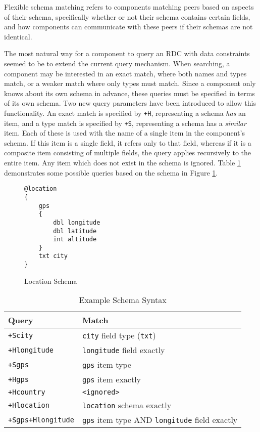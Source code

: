 \documentclass[12pt,twoside,notitlepage]{report}
\begin{document}
Flexible schema matching refers to components matching peers based on aspects of their schema, specifically whether or not their schema contains certain fields, and how components can communicate with these peers if their schemas are not identical. 

The most natural way for a component to query an RDC with data constraints seemed to be to extend the current query mechanism. 
When searching, a component may be interested in an exact match, where both names and types match, or a weaker match where only types must match. 
Since a component only knows about its own schema in advance, these queries must be specified in terms of its own schema.
Two new query parameters have been introduced to allow this functionality. 
An exact match is specified by {\tt +H}, representing a schema {\sl has} an item, and a type match is specified by {\tt +S}, representing a schema has a {\sl similar} item.
Each of these is used with the name of a single item in the component's schema.
If this item is a single field, it refers only to that field, whereas if it is a composite item consisting of multiple fields, the query applies recursively to the entire item. 
Any item which does not exist in the schema is ignored. 
Table \ref{tab:example_schema_syntax} demonstrates some possible queries based on the schema in Figure \ref{fig:locationschema}.

\begin{figure}
\begin{lstlisting}
@location
{
	gps
	{
		dbl longitude
		dbl latitude
		int altitude
	}
	txt city
}
\end{lstlisting}
\caption{Location Schema}
\label{fig:locationschema}
\end{figure}

\begin{table}
\centering

\begin{tabular}{l l}
\hline\hline
Query & Match \\
\hline

{\tt +Scity}		& {\tt city} field type ({\tt txt}) \\
{\tt +Hlongitude}	& {\tt longitude} field exactly \\

{\tt +Sgps}			& {\tt gps} item type \\
{\tt +Hgps}			& {\tt gps} item exactly \\

{\tt +Hcountry}		& {\tt <ignored>} \\
{\tt +Hlocation}	& {\tt location} schema exactly \\

{\tt +Sgps+Hlongitude}	& {\tt gps} item type AND {\tt longitude} field exactly \\

\hline
\end{tabular}

\caption{Example Schema Syntax}
\label{tab:example_schema_syntax}
\end{table}
\end{document}
